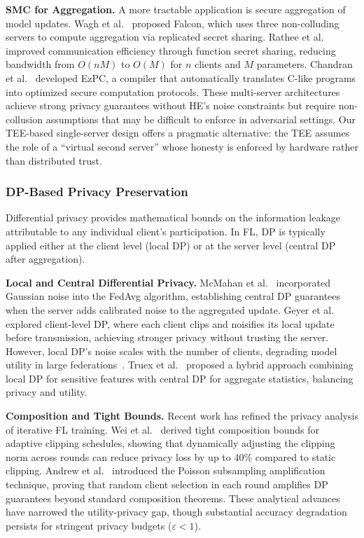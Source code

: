 \textbf{SMC for Aggregation.} A more tractable application is secure aggregation of model updates. Wagh et al.~\cite{wagh2021falcon} proposed Falcon, which uses three non-colluding servers to compute aggregation via replicated secret sharing. Rathee et al.~\cite{rathee2020cryptflow2} improved communication efficiency through function secret sharing, reducing bandwidth from $O(nM)$ to $O(M)$ for $n$ clients and $M$ parameters. Chandran et al.~\cite{chandran2019ezpc} developed EzPC, a compiler that automatically translates C-like programs into optimized secure computation protocols. These multi-server architectures achieve strong privacy guarantees without HE's noise constraints but require non-collusion assumptions that may be difficult to enforce in adversarial settings. Our TEE-based single-server design offers a pragmatic alternative: the TEE assumes the role of a ``virtual second server'' whose honesty is enforced by hardware rather than distributed trust.

\subsubsection{DP-Based Privacy Preservation}
\label{subsubsec:dp-based}

Differential privacy provides mathematical bounds on the information leakage attributable to any individual client's participation. In FL, DP is typically applied either at the client level (local DP) or at the server level (central DP after aggregation).

\textbf{Local and Central Differential Privacy.} McMahan et al.~\cite{mcmahan2017communication} incorporated Gaussian noise into the FedAvg algorithm, establishing central DP guarantees when the server adds calibrated noise to the aggregated update. Geyer et al.~\cite{geyer2017differentially} explored client-level DP, where each client clips and noisifies its local update before transmission, achieving stronger privacy without trusting the server. However, local DP's noise scales with the number of clients, degrading model utility in large federations~\cite{geyer2017differentially}. Truex et al.~\cite{truex2020hybrid} proposed a hybrid approach combining local DP for sensitive features with central DP for aggregate statistics, balancing privacy and utility.

\textbf{Composition and Tight Bounds.} Recent work has refined the privacy analysis of iterative FL training. Wei et al.~\cite{wei2020user} derived tight composition bounds for adaptive clipping schedules, showing that dynamically adjusting the clipping norm across rounds can reduce privacy loss by up to 40\% compared to static clipping. Andrew et al.~\cite{andrew2021differentially} introduced the Poisson subsampling amplification technique, proving that random client selection in each round amplifies DP guarantees beyond standard composition theorems. These analytical advances have narrowed the utility-privacy gap, though substantial accuracy degradation persists for stringent privacy budgets ($\varepsilon < 1$).

